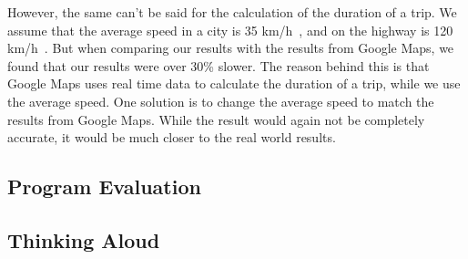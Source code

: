 However, the same can't be said for the calculation of the duration of a trip.
We assume that the average speed in a city is 35 km/h~\cite{time_city}, and on the highway is 120
km/h~\cite{time_highway}.
But when comparing our results with the results from Google Maps, we found that our results were over 30\% slower.
The reason behind this is that Google Maps uses real time data to calculate the duration of a trip, while we use the
average speed.
One solution is to change the average speed to match the results from Google Maps.
While the result would again not be completely accurate, it would be much closer to the real world results.

\subsection{Program Evaluation}\label{subsec:program-evaluation}


\subsection{Thinking Aloud}\label{subsec:thinking-aloud}

